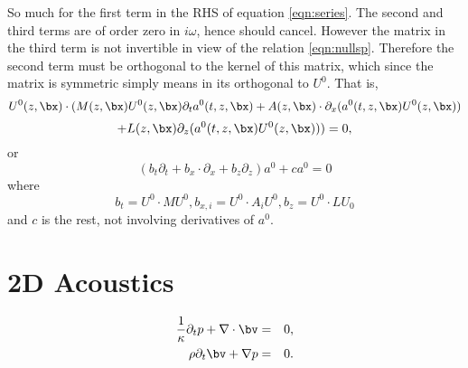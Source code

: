 So much for the first term in the RHS of equation
\ref{eqn:series}. The second and third terms are of order zero in
$i\omega$, hence should cancel. However the matrix in the third term
is not invertible in view of the relation \ref{eqn:nullsp}. Therefore
the second term must be orthogonal to the kernel of this matrix, which
since the matrix is symmetric simply means in its orthogonal to $U^0$.
That is,
\[
U^0(z,\bx) \cdot (M(z,\bx) U^0(z,\bx) \partial_t a^0(t,z,\bx) + A(z,\bx)\cdot \partial_x
(a^0(t,z,\bx) U^0(z,\bx))
\]
\[+ L(z,\bx)\partial_z
  (a^0(t,z,\bx)U^0(z,\bx))) = 0,
\]
or
\[
 (b_t \partial_t + b_x \cdot \partial_x + b_z \partial_z)
 a^0 + c a^0 = 0
\]
where
\[
  b_t = U^0 \cdot M U^0, b_{x,i} = U^0 \cdot A_i U^0, b_z = U^0 \cdot
  L U_0
\]
and $c$ is the rest, not involving derivatives of $a^0$.



\section{2D Acoustics}

\begin{eqnarray}
  \frac{1}{\kappa}\partial_t p + \nabla \cdot \bv & = & 0, \nonumber \\
  \rho \partial_t \bv + \nabla p & = & 0.
  \label{eqn:awe}                                     
\end{eqnarray}

